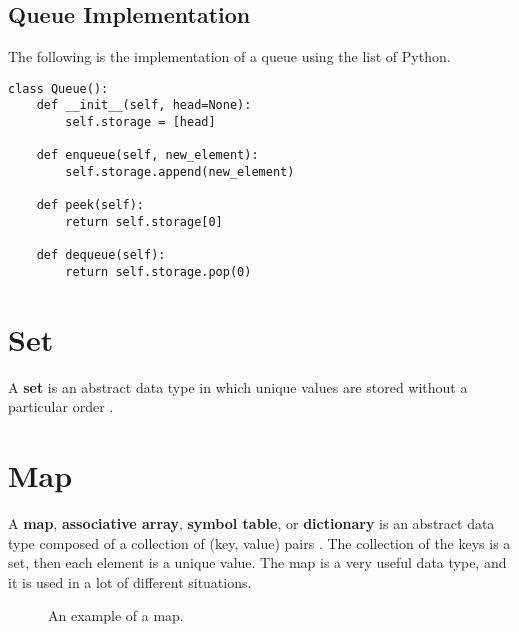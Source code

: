 \subsection{Queue Implementation}
The following is the implementation of a queue using the list of Python.
\begin{lstlisting}[firstnumber=1, caption={Queue implementation.}]
class Queue():
	def __init__(self, head=None):
		self.storage = [head]
	
	def enqueue(self, new_element):
		self.storage.append(new_element)
	
	def peek(self):
		return self.storage[0]
	
	def dequeue(self):
		return self.storage.pop(0)
\end{lstlisting}

\section{Set}
A \textbf{set} is an abstract data type in which unique values are stored without a particular order \cite{wikiset}.

\section{Map}
A \textbf{map}, \textbf{associative array}, \textbf{symbol table}, or \textbf{dictionary} is an abstract data type composed of a collection of (key, value) pairs \cite{wikihashmap}. The collection of the keys is a set, then each element is a unique value. The map is a very useful data type, and it is used in a lot of different situations. 

\begin{figure}[H]
\centering
{}
\caption[An example of a map.]{An example of a map.}
\label{map_1}
\end{figure}

